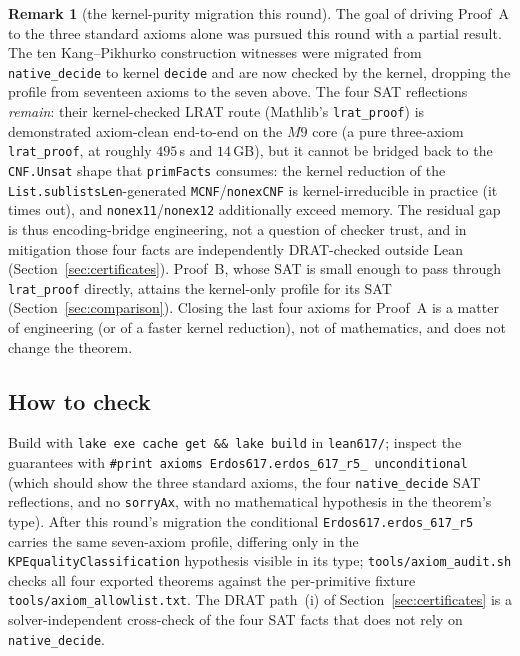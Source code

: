 \documentclass[11pt,reqno]{amsart}
\theoremstyle{definition}
\newtheorem{remark}[theorem]{Remark}
\theoremstyle{remark}
\begin{document}
\begin{remark}[the kernel-purity migration this round]
The goal of driving Proof~A to the three standard axioms alone was pursued this round with
a partial result. The ten Kang--Pikhurko construction witnesses were migrated from
\texttt{native\_decide} to kernel \texttt{decide} and are now checked by the kernel,
dropping the profile from seventeen axioms to the seven above. The four SAT reflections
\emph{remain}: their kernel-checked LRAT route (Mathlib's \texttt{lrat\_proof}) is
demonstrated axiom-clean end-to-end on the $M9$ core (a pure three-axiom
\texttt{lrat\_proof}, at roughly $495$\,s and $14$\,GB), but it cannot be bridged back to
the \texttt{CNF.Unsat} shape that \texttt{primFacts} consumes: the kernel reduction of the
\texttt{List.sublistsLen}-generated \texttt{MCNF}/\texttt{nonexCNF} is kernel-irreducible in
practice (it times out), and \texttt{nonex11}/\texttt{nonex12} additionally exceed memory.
The residual gap is thus encoding-bridge engineering, not a question of checker trust, and
in mitigation those four facts are independently DRAT-checked outside Lean
(Section~\ref{sec:certificates}).
Proof~B, whose SAT is small enough to pass through \texttt{lrat\_proof} directly, attains
the kernel-only profile for its SAT (Section~\ref{sec:comparison}). Closing the last four
axioms for Proof~A is a matter of engineering (or of a faster kernel reduction), not of
mathematics, and does not change the theorem.
\end{remark}

\subsection{How to check}
Build with \texttt{lake exe cache get \&\& lake build} in \texttt{lean617/}; inspect
the guarantees with \texttt{\#print axioms Erdos617.erdos\_617\_r5\_\allowbreak
unconditional} (which should show the three standard axioms, the four
\texttt{native\_decide} SAT reflections, and no \texttt{sorryAx}, with no mathematical
hypothesis in the theorem's type). After this round's migration the conditional
\texttt{Erdos617.erdos\_617\_r5} carries the same seven-axiom profile, differing only in
the \texttt{KPEqualityClassification} hypothesis visible in its type;
\texttt{tools/axiom\_audit.sh} checks all four exported theorems against the
per-primitive fixture \texttt{tools/axiom\_allowlist.txt}. The
DRAT path~(i) of Section~\ref{sec:certificates} is a solver-independent cross-check of
the four SAT facts that does not rely on \texttt{native\_decide}.
\end{document}
